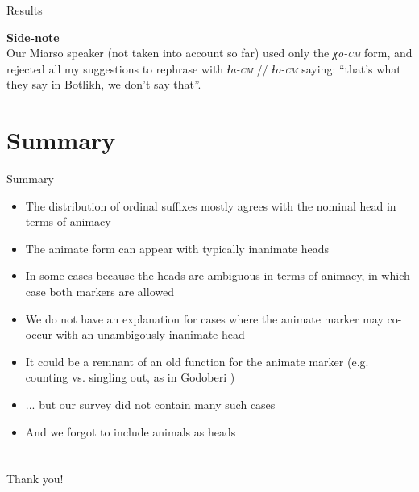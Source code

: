 \begin{frame}{Results}

\centering
\textbf{Side-note} \\
Our Miarso speaker (not taken into account so far) used only the \textit{χo-\textsc{cm}} form, and rejected all my suggestions to rephrase with \textit{ɬa-\textsc{cm}} // \textit{ɬo-\textsc{cm}} saying: ``that's what they say in Botlikh, we don't say that''.
    
\end{frame}

\section{Summary}
\begin{frame}{Summary}
    
    \begin{itemize}
        \item The distribution of ordinal suffixes mostly agrees with the nominal head in terms of animacy
        \item The animate form can appear with typically inanimate heads
        \item In some cases because the heads are ambiguous in terms of animacy, in which case both markers are allowed
        \pause
        \item We do not have an explanation for cases where the animate marker may co-occur with an unambigously inanimate head
        \item It could be a remnant of an old function for the animate marker (e.g. counting vs. singling out, as in Godoberi \citep[241--243]{tatevosov1996})
        \item ... but our survey did not contain many such cases
        \item And we forgot to include animals as heads
    \end{itemize}
\end{frame}


\section*{}

\begin{frame}{Thank you!}

\begin{figure}[h]
\centering
{}
\end{figure}
    
\end{frame}

